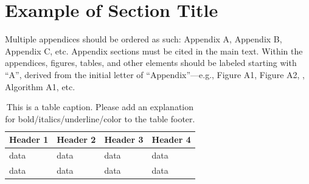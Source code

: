 \documentclass[journal,article,submit,moreauthors,pdftex]{Definitions/tsp}
\begin{document}
\section[\appendixname~\thesection]{Example of Section Title} \label{app:app2}
Multiple appendices should be ordered as such: Appendix A, Appendix B, Appendix C, etc. Appendix sections must be cited in the main text. Within the appendices, figures, tables, and other elements should be labeled starting with “A”, derived from the initial letter of “Appendix”---e.g., Figure A1, Figure A2, , Algorithm A1, etc.

\begin{table}[H] 
\tablesize{\footnotesize}
\caption{This is a table caption. Please add an explanation for bold/italics/underline/color to the table footer.}
\label{tabref:table-a1}
\begin{tabularx}{\textwidth}{CCCC}
\toprule
\textbf{Header 1}	&\textbf{Header 2}	&\textbf{Header 3}	&\textbf{Header 4}\\
\midrule
data	&data	&data	&data\\
data	&data	&data	&data\\
\bottomrule
\end{tabularx}
\end{table}





\end{document}
